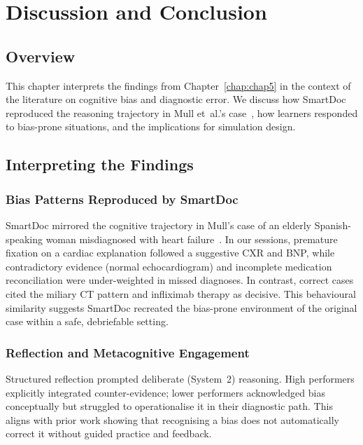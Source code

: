 
\chapter{Discussion and Conclusion}
\label{chap:ch6}

\section{Overview}
This chapter interprets the findings from Chapter~\ref{chap:chap5} in the context of the
literature on cognitive bias and diagnostic error. We discuss how SmartDoc reproduced the
reasoning trajectory in Mull et~al.'s case~\parencite{mull_cognitive_2015}, how learners
responded to bias-prone situations, and the implications for simulation design.

\section{Interpreting the Findings}

\subsection{Bias Patterns Reproduced by SmartDoc}
SmartDoc mirrored the cognitive trajectory in Mull’s case of an elderly Spanish-speaking
woman misdiagnosed with heart failure~\parencite{mull_cognitive_2015}.
In our sessions, premature fixation on a cardiac explanation followed a suggestive CXR and
BNP, while contradictory evidence (normal echocardiogram) and incomplete medication
reconciliation were under-weighted in missed diagnoses. In contrast, correct cases cited
the miliary CT pattern and infliximab therapy as decisive. This behavioural similarity
suggests SmartDoc recreated the bias-prone environment of the original case within a safe,
debriefable setting.

\subsection{Reflection and Metacognitive Engagement}
Structured reflection prompted deliberate (System~2) reasoning. High performers explicitly
integrated counter-evidence; lower performers acknowledged bias conceptually but struggled
to operationalise it in their diagnostic path. This aligns with prior work showing that
recognising a bias does not automatically correct it without guided practice and feedback.

